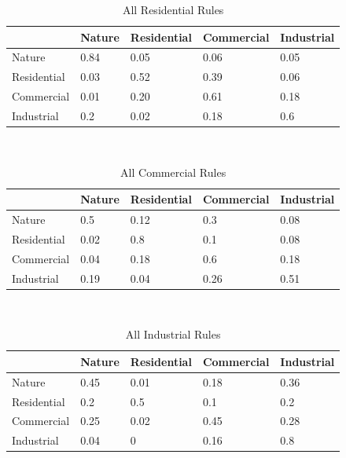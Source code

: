 \documentclass[a4paper,12pt]{report}
\begin{document}
\begin{table}[ht]
\centering
\begin{tabular}{l|l|l|l|l}
            & Nature & Residential & Commercial & Industrial \\ \hline
Nature      & 0.84   & 0.05        & 0.06       & 0.05       \\ \hline
Residential & 0.03   & 0.52        & 0.39       & 0.06       \\ \hline
Commercial  & 0.01   & 0.20        & 0.61       & 0.18       \\ \hline
Industrial  & 0.2    & 0.02        & 0.18       & 0.6       
\end{tabular}
\\[10pt]
\caption{All Residential Rules}
\end{table}

\begin{table}[ht]
\centering
\begin{tabular}{l|l|l|l|l}
            & Nature & Residential & Commercial & Industrial \\ \hline
Nature      & 0.5    & 0.12        & 0.3        & 0.08       \\ \hline
Residential & 0.02   & 0.8         & 0.1        & 0.08       \\ \hline
Commercial  & 0.04   & 0.18        & 0.6        & 0.18       \\ \hline
Industrial  & 0.19   & 0.04        & 0.26       & 0.51      
\end{tabular}
\\[10pt]
\caption{All Commercial Rules}
\end{table}

\begin{table}[ht]
\centering
\begin{tabular}{l|l|l|l|l}
            & Nature & Residential & Commercial & Industrial \\ \hline
Nature      & 0.45   & 0.01        & 0.18       & 0.36       \\ \hline
Residential & 0.2    & 0.5         & 0.1        & 0.2        \\ \hline
Commercial  & 0.25   & 0.02        & 0.45       & 0.28       \\ \hline
Industrial  & 0.04   & 0           & 0.16       & 0.8       
\end{tabular}
\\[10pt]
\caption{All Industrial Rules}
\end{table}
\end{document}
